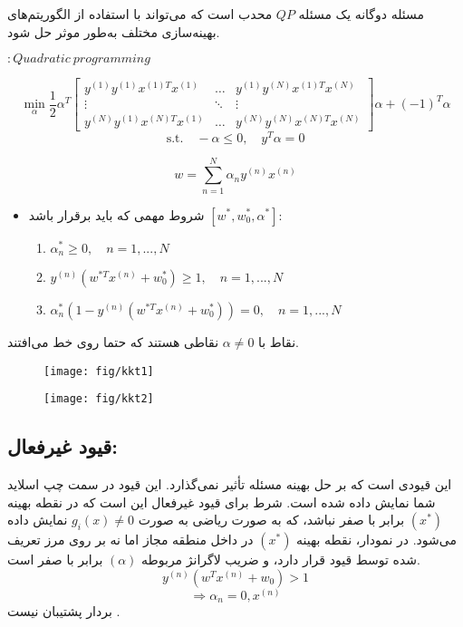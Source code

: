 \documentclass[12pt]{article}
\begin{document}
مسئله دوگانه یک مسئله $QP$ محدب است که می‌تواند با استفاده از الگوریتم‌های بهینه‌سازی مختلف به‌طور موثر حل شود.

$:Quadratic\:programming$
\begin{latin}
    \[
    \min_{\alpha} \frac{1}{2} \alpha^T 
    \begin{bmatrix}
        y^{(1)} y^{(1)} x^{(1)T} x^{(1)} & \ldots & y^{(1)} y^{(N)} x^{(1)T} x^{(N)} \\
        \vdots & \ddots & \vdots \\
        y^{(N)} y^{(1)} x^{(N)T} x^{(1)} & \ldots & y^{(N)} y^{(N)} x^{(N)T} x^{(N)}
    \end{bmatrix}
    \alpha + (-1)^T \alpha
    \]
    \[
    \text{s.t.} \quad -\alpha \leq 0, \quad y^T \alpha = 0
    \]
\end{latin}

\[
w = \sum_{n=1}^{N} \alpha_n y^{(n)} x^{(n)}
\]

\begin{itemize}
    \item شروط مهمی که باید برقرار باشد \([w^*, w_0^*, \alpha^*]\):
    \begin{enumerate}
        \item \( \alpha_n^* \geq 0, \quad n = 1, ..., N \)
        \item \( y^{(n)} (w^{*T} x^{(n)} + w_0^*) \geq 1, \quad n = 1, ..., N \)
        \item \( \alpha_n^* (1 - y^{(n)} (w^{*T} x^{(n)} + w_0^*)) = 0, \quad n = 1, ..., N \)
    \end{enumerate}
\end{itemize}

نقاط با $\alpha \neq 0$ نقاطی هستند که حتما روی خط می‌افتند.

\begin{figure}[!h]
\centering
\texttt{[image: fig/kkt1]}
\label{fig:kkt1}
\end{figure}

\begin{figure}[!h]
\centering
\texttt{[image: fig/kkt2]}
\label{fig:kkt2}
\end{figure}



\subsection{قیود غیرفعال:}
این قیودی است که بر حل بهینه مسئله تأثیر نمی‌گذارد. این قیود در سمت چپ اسلاید شما نمایش داده شده است. شرط برای قیود غیرفعال این است که در نقطه بهینه 
$(x^*)$ برابر با صفر نباشد، که به صورت ریاضی به صورت 
$g_i(x) \neq 0$
نمایش داده می‌شود. در نمودار، نقطه بهینه 
$(x^*)$
در داخل منطقه مجاز اما نه بر روی مرز تعریف شده توسط قیود قرار دارد، و ضریب لاگرانژ مربوطه $(α)$ برابر با صفر است.
$$y^{(n)} (w^Tx^{(n)} + w_0) > 1$$
$$\Rightarrow \alpha_n = 0 ,x^{(n)}$$
بردار پشتیبان نیست  . 
\end{document}
